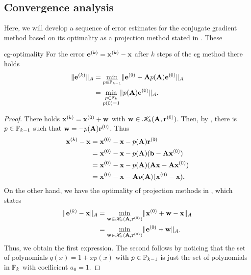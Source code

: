 \subsection{Convergence analysis}

\begin{intro}
  Here, we will develop a sequence of error estimates for the
  conjugate gradient method based on its optimality as a projection
  method stated in . These
\end{intro}

\begin{Theorem}{cg-optimality}
  For the error $\ve^{(k)} = \vx^{(k)}-\vx$ after $k$ steps of the cg
  method there holds
  \begin{align}
    \norm{\ve^{(k)}}_A
    & = \min_{p\in \P_{k-1}}
      \norm{\ve^{(0)} + \mata p(\mata) \ve^{(0)}}_A\\
    &= \min_{\substack{p\in\P_k\\p(0) = 1}} \norm{p(\mata)\ve^{(0)}}_A.
  \end{align}
\end{Theorem}

\begin{proof}
  There holds $\vx^{(k)} = \vx^{(0)} + \vw$ with
  $\vw \in \krylov_k(\mata,\vr^{(0)})$. Then, by
  , there is $p\in\P_{k-1}$ such
  that $\vw = -p(\mata) \vr^{(0)}$. Thus
  \begin{align}
    \vx^{(k)} - \vx
    &= \vx^{(0)} - \vx - p(\mata)\vr^{(0)}\\
    &= \vx^{(0)} - \vx - p(\mata) (\vb-\mata\vx^{(0)})\\
    &= \vx^{(0)} - \vx - p(\mata) (\mata\vx-\mata\vx^{(0)})\\
    &= \vx^{(0)} - \vx - \mata p(\mata) (\vx^{(0)}-\vx).
  \end{align}
  On the other hand, we have the optimality of projection methods in
  , which states
  \begin{align}
    \norm{\ve^{(k)} -\vx}_A
    &= \min_{\vw\in \krylov_k(\mata,\vr^{(0)})} \norm{\vx^{(0)}+\vw-\vx}_A\\
    &= \min_{\vw\in \krylov_k(\mata,\vr^{(0)})} \norm{\ve^{(0)}+\vw}_A.
  \end{align}
  Thus, we obtain the first expression. The second follows by noticing
  that the set of polynomials $q(x) = 1+xp(x)$ with $p\in\P_{k-1}$ is
  just the set of polynomials in $\P_k$ with coefficient $a_0 = 1$.
\end{proof}

